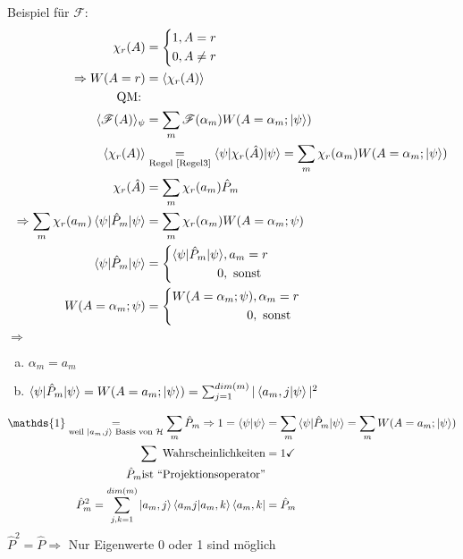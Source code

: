 \begin{enumerate}[1.]
\begin{enumerate}[(a)]
			Beispiel für $\mathscr{F}$:
				\begin{align*}
					\chi_r (A) &= 
					\left\{
					\begin{aligned}
						1&, A = r \\
						0&, A \neq r
					\end{aligned}
					\right. \\
					\Rightarrow W (A = r) &= \langle {\chi_r (A)} \rangle \\
					\text{QM: } \\
					\langle {\mathscr{F}(A)} \rangle_\psi &= \sum_m \mathscr{F}(\alpha_m) W(A = \alpha_m; \ket{\psi}) \\
					\langle {\chi_r(A)} \rangle &\underset{\text{Regel \ref{Regel3}}}{=}
					\braket{\psi | \chi_r(\hat{A}) | \psi} = \sum_m \chi_r (\alpha_m) W(A = \alpha_m ; \ket{\psi}) \\
					\chi_r (\hat{A}) &= \sum_m \chi_r (a_m) \hat{P}_m \\
					\Rightarrow \sum_m \chi_r (a_m) \braket{\psi | \hat{P}_m | \psi} 
					&= \sum_m \chi_r (\alpha_m) W(A = \alpha_m; \psi) \\
					\braket{\psi | \hat{P}_m | \psi} &=
					\left\{
					\begin{aligned}
						\braket{\psi | \hat{P}_m | \psi} &, a_m = r \\
						0 &, \text{ sonst}
					\end{aligned}
					\right. \\
					W(A = \alpha_m; \psi) &=
					\left\{
					\begin{aligned}
						W(A = \alpha_m; \psi) &, \alpha_m = r \\
						0 &, \text{ sonst}
					\end{aligned}
					\right.
				\end{align*}
				$\Rightarrow$
				\begin{enumerate}[(a)] 
					\item $\alpha_m = a_m$
					\item $\braket{\psi | \hat{P}_m | \psi} = 
					W(A = a_m ; \ket{\psi}) = 
					\sum_{j = 1}^{dim(m)} |\braket{a_m, j | \psi}|^2$
				\end{enumerate}
				\begin{align*}
				\mathds{1} \underset{\text{weil } \ket{a_m, j} \text{ Basis von }\Hil}{=}
				\sum_m \hat{P}_m \Rightarrow
				1 = \braket{\psi | \psi} &= \sum_m \braket{\psi | \hat{P}_m | \psi} 
				= \sum_m W(A = a_m ; \ket{\psi}) \\
				\sum \text{ Wahrscheinlichkeiten} &= 1 \checkmark \\
				\hat{P}_m \text{ist ``Projektionsoperator''}& \\
				\hat{P}_m^2 = \sum_{j, k = 1}^{dim(m)} \ket{a_m, j} \braket{a_m j | a_m, k} \bra{a_m, k} &= \hat{P}_m
				\end{align*}
				$\hat{P}^2 = \hat{P} \Rightarrow$ Nur Eigenwerte 0 oder 1 sind möglich
		\end{enumerate}
	\end{enumerate}	
